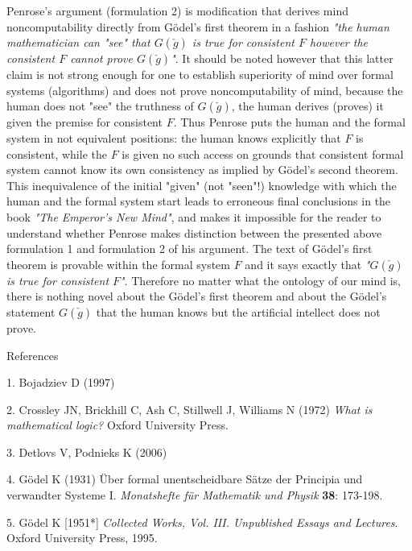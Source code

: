 \documentclass[12pt]{article}
\begin{document}
Penrose's argument (formulation 2) is modification that derives mind noncomputability directly from G\"odel's first theorem in a fashion \emph{"the human mathematician can "see" that $G(\check{g})$ is true for consistent $F$ however the consistent $F$ cannot prove $G(\check{g})$"}. It should be noted however that this latter claim is not strong enough for one to establish superiority of mind over formal systems (algorithms) and does not prove noncomputability of mind, because the human does not "see" the truthness of $G(\check{g})$, the human derives (proves) it given the premise for consistent $F$. Thus Penrose puts the human and the formal system in not equivalent positions: the human knows explicitly that $F$ is consistent, while the $F$ is given no such access on grounds that consistent formal system cannot know its own consistency as implied by G\"odel's second theorem. This inequivalence of the initial "given" (not "seen"!) knowledge with which the human and the formal system start leads to erroneous final conclusions in the book \emph{"The Emperor's New Mind"}, and makes it impossible for the reader to understand whether Penrose makes distinction between the presented above formulation 1 and formulation 2 of his argument. The text of G\"odel's first theorem is provable within the formal system $F$ and it says exactly that \emph{"$G(\check{g})$ is true for consistent $F$"}. Therefore no matter what the ontology of our mind is, there is nothing novel about the G\"odel's first theorem and about the G\"odel's statement $G(\check{g})$ that the human knows but the artificial intellect does not prove.

References

1. Bojadziev D (1997) 

2. Crossley JN, Brickhill C, Ash C, Stillwell J, Williams
N (1972) \emph{What is mathematical logic?} Oxford University Press.

3. Detlovs V, Podnieks K (2006)  

4. G\"odel K (1931) \"Uber formal unentscheidbare S\"atze der
Principia  und verwandter Systeme I. \emph{Monatshefte
f\"ur Mathematik und Physik} \textbf{38}: 173-198.

5. G\"odel K [1951*] \emph{Collected Works, Vol. III. Unpublished Essays and Lectures}. Oxford University Press, 1995.
\end{document}
